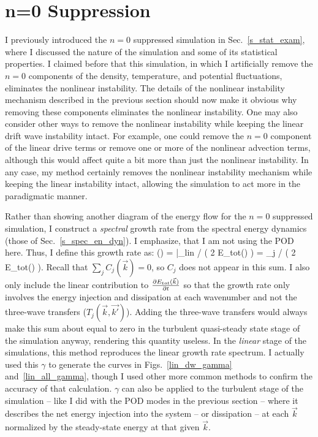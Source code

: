 \section{n=0 Suppression}
\label{ss_n0_supp}

I previously introduced the $n=0$ suppressed simulation in Sec.~\ref{s_stat_exam}, where I discussed the nature of the simulation and some of its statistical properties. I claimed before that
this simulation, in which I artificially remove the $n=0$ components of the density, temperature, and potential fluctuations, eliminates the nonlinear instability.
The details of the nonlinear instability mechanism described in the previous section should now make it obvious why removing these components eliminates the nonlinear instability.
One may also consider other ways to remove the nonlinear instability while keeping the linear drift wave instability intact. For example, one could remove the $n=0$ component of the linear
drive terms or remove one or more of the nonlinear advection terms, although this would affect quite a bit more than just the nonlinear instability. In any case, my method
certainly removes the nonlinear instability mechanism while keeping the linear instability intact, allowing the simulation to act more in the paradigmatic manner.

Rather than showing another diagram of the energy flow for the $n=0$ suppressed simulation, I construct a \emph{spectral} growth rate from the spectral energy dynamics 
(those of Sec.~\ref{s_spec_en_dyn}). I emphasize, that I am not using the POD here. Thus, I define this growth rate as:
\beq
\label{gamma_def}
\gamma() =  \bigg|_{lin} \bigg/ \left( 2 E_{tot}() \right) = \sum_j  \bigg/ \left( 2 E_{tot}() \right).
\eeq
Recall that $\sum_j C_j(\vec{k}) = 0$, so $C_j$ does not appear in this sum. I also only include the linear contribution to $ \frac{\partial E_{tot}({\vec{k}})}{\partial t}$ so that the growth rate
only involves the energy injection and dissipation at each wavenumber and not the three-wave transfers ($T_j(\vec{k},\vec{k'})$). 
Adding the three-wave transfers would always make this sum about equal to zero in the turbulent
quasi-steady state stage of the simulation anyway, rendering this quantity useless. 
In the \emph{linear} stage of the simulations, this method reproduces the linear growth rate spectrum.
I actually used this $\gamma$ to generate the curves in Figs.~\ref{lin_dw_gamma} and~\ref{lin_all_gamma}, though I used other more common methods to confirm the accuracy of that calculation.
$\gamma$ can also be applied to the turbulent stage of the simulation -- like I did with the POD modes in the previous section -- 
where it describes the net energy injection into the system -- or dissipation -- at each $\vec{k}$ normalized by the steady-state energy at that given $\vec{k}$.

